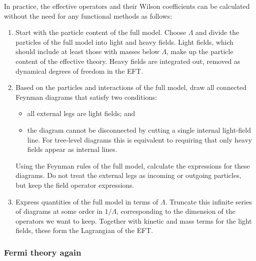 In practice, the effective operators and their Wilson coefficients can
be calculated without the need for any functional methods as follows:
%
\begin{enumerate}
\item Start with the particle content of the full model. Choose
  $\Lambda$ and divide the particles of the full model into light and
  heavy fields. Light fields, which should include at least those with
  masses below $\Lambda$, make up the particle content of the
  effective theory. Heavy fields are integrated out, \ie removed as
  dynamical degrees of freedom in the EFT.
%
\item Based on the particles and interactions of the full model, draw
  all connected Feynman diagrams that satisfy two conditions:
%
  \begin{itemize}
    \item all external legs are light fields; and
    \item the diagram cannot be disconnected by cutting a single
      internal light-field line. For tree-level diagrams this is
      equivalent to requiring that only heavy fields appear as
      internal lines.
  \end{itemize}
%
  Using the Feynman rules of the full model, calculate the expressions
  for these diagrams. Do not treat the external legs as incoming or
  outgoing particles, but keep the field operator expressions.
%
\item Express quantities of the full model in terms of
  $\Lambda$. Truncate this infinite series of diagrams at some order
  in $1/\Lambda$, corresponding to the dimension of the operators we
  want to keep. Together with kinetic and mass terms for the light
  fields, these form the Lagrangian of the EFT.
\end{enumerate}



  
\subsubsection{Fermi theory again}

